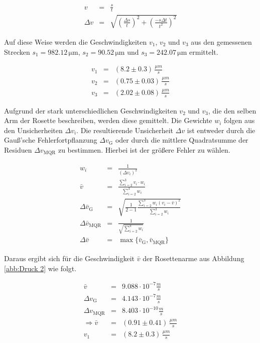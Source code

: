 \documentclass[12pt,a4paper]{scrartcl}
\numberwithin{equation}{section} %
\renewcommand{\[}{} %
\renewcommand{\]}{\noindent} %
\begin{document}
\[
\begin{eqnarray}
    v &=& \frac{s}{t} \\
    \Delta v &=&
        \sqrt{
            \left(\frac{\Delta s}{t}\right)^2
            + \left(\frac{-s \Delta t}{t^2}\right)^2
        }
\end{eqnarray}
\]

\noindent
Auf diese Weise werden die Geschwindigkeiten \(v_1\), \(v_2\) und
\(v_3\) aus den gemessenen Strecken \(s_1=982.12\mathrm{\,\mu m}\),
\(s_2=90.52\mathrm{\,\mu m}\) und \(s_3=242.07\mathrm{\,\mu m}\)
ermittelt.

\[
\begin{eqnarray}
    v_1 &=& (8.2 \pm 0.3) \,\frac{\mu m}{s} \\
    v_2 &=& (0.75 \pm 0.03) \,\frac{\mu m}{s} \\
    v_3 &=& (2.02 \pm 0.08) \,\frac{\mu m}{s}
\end{eqnarray}
\]

\noindent
Aufgrund der stark unterschiedlichen Geschwindigkeiten \(v_2\) und
\(v_3\), die den selben Arm der Rosette beschreiben, werden diese
gemittelt. Die Gewichte \(w_i\) folgen aus den Unsicherheiten
\(\Delta v_i\). Die resultierende Unsicherheit \(\Delta v\) ist entweder
durch die Gauß'sche Fehlerfortpflanzung \(\Delta v_\mathrm{G}\) oder
durch die mittlere Quadratsumme der Residuen \(\Delta v_\mathrm{MQR}\)
zu bestimmen. Hierbei ist der größere Fehler zu wählen.

\[
\begin{eqnarray}
    w_i &=& \frac{1}{(\Delta v_i)^2} \\
    \bar{v} &=& \frac{\sum_{i=2}^{3} v_i\cdot w_i}{\sum_{i=2}^{3} w_i} \\
    \Delta \bar{v}_\mathrm{G} &=&
        \sqrt{\frac{1}{2-1}\frac{\sum_{i=2}^{3}w_i(v_i-\bar{v})^2}{\sum_{i=2}^{3}w_i}} \\
    \Delta \bar{v}_\mathrm{MQR} & = & \frac{1}{\sqrt{\sum_{i=2}^{3}w_i}} \\
    \Delta \bar{v} &=& \max\{\bar{v}_\mathrm{G}, \bar{v}_\mathrm{MQR}\}
\end{eqnarray}
\]

\noindent
Daraus ergibt sich für die Geschwindigkeit \(\bar v\) der Rosettenarme
aus Abbildung \ref{abb:Druck 2} wie folgt.

\[
\begin{eqnarray}
    \bar{v} &=& 9.088 \cdot 10^{-7} \frac{m}{s} \\
    \Delta v_\mathrm{G} &=& 4.143 \cdot 10^{-7} \frac{m}{s} \\
    \Delta v_\mathrm{MQR} &=& 8.403 \cdot 10^{-10} \frac{m}{s} \\
    \Rightarrow \bar{v} &=& (0.91 \pm 0.41) \,\frac{\mu m}{s} \\
    v_1 &=& (8.2 \pm 0.3) \,\frac{\mu m}{s}
\end{eqnarray}
\]
\end{document}
